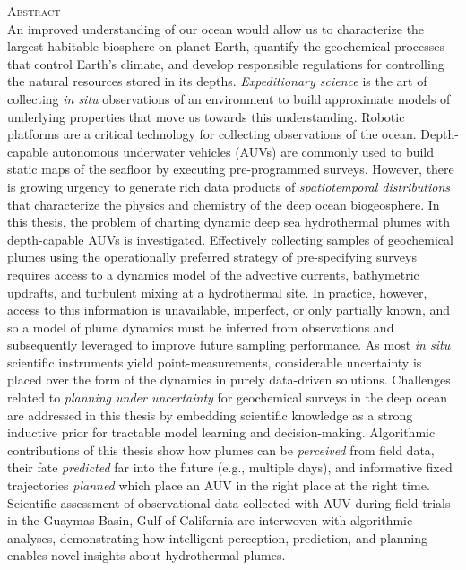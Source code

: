     \begin{singlespace}
    {\parindent0pt 
        {\large \textsc{Abstract}} \\ %

       An improved understanding of our ocean would allow us to characterize the largest habitable biosphere on planet Earth, quantify the geochemical processes that control Earth's climate, and develop responsible regulations for controlling the natural resources stored in its depths. \emph{Expeditionary science} is the art of collecting \emph{in situ} observations of an environment to build approximate models of underlying properties that move us towards this understanding. Robotic platforms are a critical technology for collecting observations of the ocean. Depth-capable autonomous underwater vehicles (AUVs) are commonly used to build static maps of the seafloor by executing pre-programmed surveys. However, there is growing urgency to generate rich data products of \emph{spatiotemporal distributions} that characterize the physics and chemistry of the deep ocean biogeosphere. In this thesis, the problem of charting dynamic deep sea hydrothermal plumes with depth-capable AUVs is investigated. Effectively collecting samples of geochemical plumes using the operationally preferred strategy of pre-specifying surveys requires access to a dynamics model of the advective currents, bathymetric updrafts, and turbulent mixing at a hydrothermal site. In practice, however, access to this information is unavailable, imperfect, or only partially known, and so a model of plume dynamics must be inferred from observations and subsequently leveraged to improve future sampling performance. As most \emph{in situ} scientific instruments yield point-measurements, considerable uncertainty is placed over the form of the dynamics in purely data-driven solutions. Challenges related to \emph{planning under uncertainty} for geochemical surveys in the deep ocean are addressed in this thesis by embedding scientific knowledge as a strong inductive prior for tractable model learning and decision-making. Algorithmic contributions of this thesis show how plumes can be \emph{perceived} from field data, their fate \emph{predicted} far into the future (e.g., multiple days), and informative fixed trajectories \emph{planned} which place an AUV in the right place at the right time. Scientific assessment of observational data collected with AUV \Sentry during field trials in the Guaymas Basin, Gulf of California are interwoven with algorithmic analyses, demonstrating how intelligent perception, prediction, and planning enables novel insights about hydrothermal plumes.\\ 
       
}
\end{singlespace}
